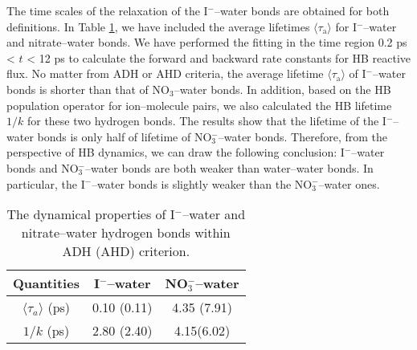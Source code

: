 The time scales of the relaxation of the I$^-$--water bonds are obtained for both definitions. 
In Table \ref{tab:properties_anion-water_hbs}, we have included the average lifetimes $\langle\tau_\text{a}\rangle$ for I$^-$--water and nitrate--water bonds. 
We have performed the fitting in the time region 0.2 ps < $t$ < 12 ps to calculate the forward and backward rate constants for HB reactive flux.
No matter from ADH or AHD criteria, the average lifetime $\langle\tau_\text{a}\rangle$ of I$^-$--water bonds is shorter than that of NO$_3$--water bonds.
In addition, based on the HB population operator for ion--molecule pairs, we also calculated the HB lifetime $1/k$ for these two hydrogen bonds. 
The results show that the lifetime of the I$^-$--water bonds is only half of lifetime of NO$_3^-$--water bonds. Therefore, from the perspective of HB dynamics,
we can draw the following conclusion: I$^-$--water bonds and NO$_3^-$--water bonds are both weaker than water--water bonds. In particular, 
the I$^-$--water bonds is slightly weaker than the NO$_3^-$--water ones.
\begin{table}[htbp]
\centering
\caption{ 
    The dynamical properties of I$^-$--water and nitrate--water hydrogen bonds within ADH (AHD) criterion.} 
\begin{tabular}{ccc}
\label{tab:properties_anion-water_hbs}
 Quantities  & I$^-$--water & NO$_3^-$--water \\
\hline
  $\langle\tau_a\rangle$ (ps) & 0.10 (0.11) & 4.35 (7.91) \\
  $1/k$ (ps) & 2.80 (2.40) & 4.15(6.02) \\
\end{tabular} %
\end{table}
%
%

